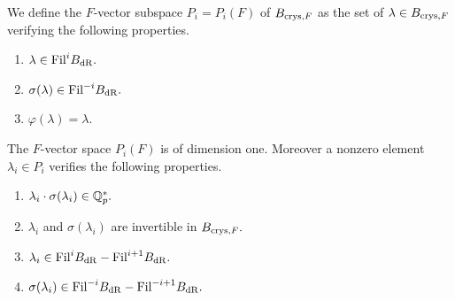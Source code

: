 \begin{definition}
\notready\label{defpiram}
We define the $F$-vector subspace $P_i=P_i(F)$ of $B_{\textnormal{crys},F}$ as the set of $\lambda \in B_{\textnormal{crys},F}$ verifying the following properties.
\begin{enumerate}

\item $\lambda \in \textnormal{Fil} ^i B_{\mathrm{dR}}.$
\item $\sigma(\lambda) \in \textnormal{Fil} ^{-i} B_{\mathrm{dR}}.$
\item $\varphi (\lambda)= \lambda.$
\end{enumerate}
\end{definition}

\begin{proposition}
\notready\label{lemmapiram} The $F$-vector space  $P_i(F)$ is of dimension one.
Moreover a nonzero element $\lambda_i \in P_i$  verifies the following properties.
\begin{enumerate}
 \item  $\lambda_i \cdot\sigma(\lambda_i) \in \mathbb{Q}^*_p.$
  \item  $\lambda_i$ and $\sigma(\lambda_i)$ are invertible in $B_{\textnormal{crys},F}.$
\item  $\lambda_i \in \textnormal{Fil} ^i B_{\mathrm{dR}}-\textnormal{Fil} ^{i+1} B_{\mathrm{dR}}.$
\item  $\sigma(\lambda_i) \in \textnormal{Fil} ^{-i} B_{\mathrm{dR}}-\textnormal{Fil} ^{-i+1} B_{\mathrm{dR}}.$
\end{enumerate}
\end{proposition}


